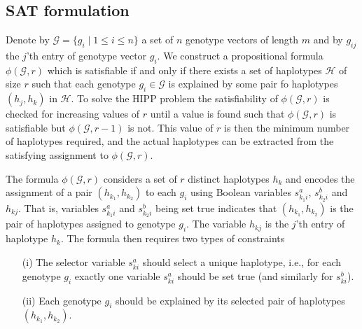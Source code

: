 \documentclass[12pt,a4paper]{article}
\begin{document}
\subsection{SAT formulation}

Denote by $\mathcal{G}=\{g_i\mid 1\leq i \leq n\}$ a set of $n$ genotype vectors of length $m$ and by $g_{ij}$ the $j$'th entry of genotype vector $g_i$.
We construct a propositional formula $\phi (\mathcal{G}, r)$ which is satisfiable if and only if there exists a set of haplotypes $\mathcal{H}$ of size $r$ such that each genotype $g_i\in \mathcal{G}$ is explained by some pair fo haplotypes $(h_j, h_k)$ in $\mathcal{H}$.
To solve the HIPP problem the satisfiability of $\phi (\mathcal{G}, r)$ is checked for increasing values of $r$ until a value is found such that $\phi (\mathcal{G}, r)$ is satisfiable but $\phi (\mathcal{G}, r-1)$ is not.
This value of $r$ is then the minimum number of haplotypes required, and the actual haplotypes can be extracted from the satisfying assignment to $\phi (\mathcal{G}, r)$.

The formula $\phi (\mathcal{G}, r)$ considers a set of $r$ distinct haplotypes $h_k$ and encodes the assignment of a pair $(h_{k_1}, h_{k_2})$ to each $g_i$ using Boolean variables $s^a_{k_1i}$, $s^b_{k_2i}$ and $h_{kj}$.
That is, variables $s^a_{k_1i}$ and $s^b_{k_2i}$ being set true indicates that $(h_{k_1}, h_{k_2})$ is the pair of haplotypes assigned to genotype $g_i$.
The variable $h_{kj}$ is the $j$'th entry of haplotype $h_k$.
The formula then requires two types of constraints
\begin{enumerate}
\item[(i)] The selector variable $s^a_{ki}$ should select a unique haplotype, i.e., for each genotype $g_i$ exactly one variable $s^a_{ki}$ should be set true (and similarly for $s^b_{ki}$). 
\item[(ii)] Each genotype $g_i$ should be explained by its selected pair of haplotypes $(h_{k_1}, h_{k_2})$. 
\end{enumerate}
\end{document}
